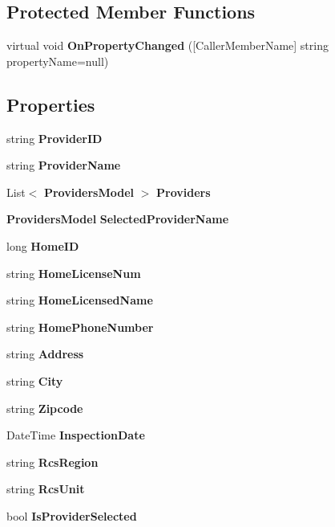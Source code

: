 \subsection*{Protected Member Functions}
\begin{DoxyCompactItemize}
\item 
virtual void \textbf{ On\+Property\+Changed} ([Caller\+Member\+Name] string property\+Name=null)
\end{DoxyCompactItemize}
\subsection*{Properties}
\begin{DoxyCompactItemize}
\item 
string \textbf{ Provider\+ID}\hspace{0.3cm}{\ttfamily  [get, set]}
\item 
string \textbf{ Provider\+Name}\hspace{0.3cm}{\ttfamily  [get, set]}
\item 
List$<$ \textbf{ Providers\+Model} $>$ \textbf{ Providers}\hspace{0.3cm}{\ttfamily  [get, set]}
\item 
\textbf{ Providers\+Model} \textbf{ Selected\+Provider\+Name}\hspace{0.3cm}{\ttfamily  [get, set]}
\item 
long \textbf{ Home\+ID}\hspace{0.3cm}{\ttfamily  [get, set]}
\item 
string \textbf{ Home\+License\+Num}\hspace{0.3cm}{\ttfamily  [get, set]}
\item 
string \textbf{ Home\+Licensed\+Name}\hspace{0.3cm}{\ttfamily  [get, set]}
\item 
string \textbf{ Home\+Phone\+Number}\hspace{0.3cm}{\ttfamily  [get, set]}
\item 
string \textbf{ Address}\hspace{0.3cm}{\ttfamily  [get, set]}
\item 
string \textbf{ City}\hspace{0.3cm}{\ttfamily  [get, set]}
\item 
string \textbf{ Zipcode}\hspace{0.3cm}{\ttfamily  [get, set]}
\item 
Date\+Time \textbf{ Inspection\+Date}\hspace{0.3cm}{\ttfamily  [get, set]}
\item 
string \textbf{ Rcs\+Region}\hspace{0.3cm}{\ttfamily  [get, set]}
\item 
string \textbf{ Rcs\+Unit}\hspace{0.3cm}{\ttfamily  [get, set]}
\item 
bool \textbf{ Is\+Provider\+Selected}\hspace{0.3cm}{\ttfamily  [get, set]}
\end{DoxyCompactItemize}
